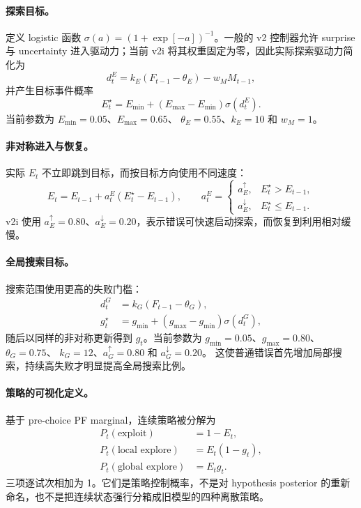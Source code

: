\paragraph{探索目标。}
定义 logistic 函数 $\sigma(a)=(1+\exp[-a])^{-1}$。一般的 v2 控制器允许 surprise 与 uncertainty 进入驱动力；当前 v2i 将其权重固定为零，因此实际探索驱动力简化为
\begin{equation}
d^E_t
=k_E(F_{t-1}-\theta_E)-w_MM_{t-1},
\label{eq:model0811-exploration-drive}
\end{equation}
并产生目标事件概率
\begin{equation}
E_t^\star
=E_{\min}+(E_{\max}-E_{\min})\sigma(d^E_t).
\label{eq:model0811-exploration-target}
\end{equation}
当前参数为 $E_{\min}=0.05$、$E_{\max}=0.65$、
$\theta_E=0.55$、$k_E=10$ 和 $w_M=1$。

\paragraph{非对称进入与恢复。}
实际 $E_t$ 不立即跳到目标，而按目标方向使用不同速度：
\begin{equation}
E_t
=E_{t-1}
+a^E_t(E_t^\star-E_{t-1}),
\qquad
a^E_t=
\begin{cases}
a_E^\uparrow,&E_t^\star>E_{t-1},\\
a_E^\downarrow,&E_t^\star\le E_{t-1}.
\end{cases}
\label{eq:model0811-exploration-smoothing}
\end{equation}
v2i 使用 $a_E^\uparrow=0.80$、$a_E^\downarrow=0.20$，表示错误可快速启动探索，而恢复到利用相对缓慢。

\paragraph{全局搜索目标。}
搜索范围使用更高的失败门槛：
\begin{align}
d^G_t
&=k_G(F_{t-1}-\theta_G),
\nonumber\\
g_t^\star
&=g_{\min}+(g_{\max}-g_{\min})\sigma(d^G_t),
\label{eq:model0811-global-target}
\end{align}
随后以同样的非对称更新得到 $g_t$。当前参数为
$g_{\min}=0.05$、$g_{\max}=0.80$、$\theta_G=0.75$、
$k_G=12$、$a_G^\uparrow=0.80$ 和 $a_G^\downarrow=0.20$。
这使普通错误首先增加局部搜索，持续高失败才明显提高全局搜索比例。

\paragraph{策略的可视化定义。}
基于 pre-choice PF marginal，连续策略被分解为
\begin{align}
P_t(\text{exploit})&=1-E_t,
\nonumber\\
P_t(\text{local explore})&=E_t(1-g_t),
\nonumber\\
P_t(\text{global explore})&=E_tg_t.
\label{eq:model0811-strategy-decomposition}
\end{align}
三项逐试次相加为 1。它们是策略控制概率，不是对 hypothesis posterior 的重新命名，也不是把连续状态强行分箱成旧模型的四种离散策略。


